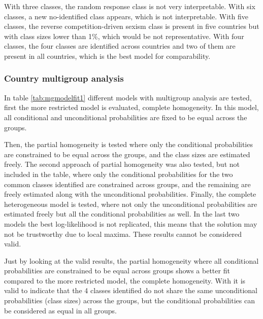 \documentclass[12pt,a4paper,oneside]{reedthesis}
\begin{document}
With three classes, the random response class is not very interpretable. With six classes, a new no-identified class appears, which is not interpretable. With five classes, the reverse competition-driven sexism class is present in five countries but with class sizes lower than 1\%, which would be not representative. With four classes, the four classes are identified across countries and two of them are present in all countries, which is the best model for comparability.

\hypertarget{country-multigroup-analysis}{%
\subsubsection{Country multigroup analysis}\label{country-multigroup-analysis}}

In table \ref{tab:mgmodelfit1} different models with multigroup analysis are tested, first the more restricted model is evaluated, complete homogeneity. In this model, all conditional and unconditional probabilities are fixed to be equal across the groups.

Then, the partial homogeneity is tested where only the conditional probabilities are constrained to be equal across the groups, and the class sizes are estimated freely. The second approach of partial homogeneity was also tested, but not included in the table, where only the conditional probabilities for the two common classes identified are constrained across groups, and the remaining are freely estimated along with the unconditional probabilities. Finally, the complete heterogeneous model is tested, where not only the unconditional probabilities are estimated freely but all the conditional probabilities as well.
In the last two models the best log-likelihood is not replicated, this means that the solution may not be trustworthy due to local maxima. These results cannot be considered valid.

Just by looking at the valid results, the partial homogeneity where all conditional probabilities are constrained to be equal across groups shows a better fit compared to the more restricted model, the complete homogeneity. With it is valid to indicate that the 4 classes identified do not share the same unconditional probabilities (class sizes) across the groups, but the conditional probabilities can be considered as equal in all groups.
\end{document}
